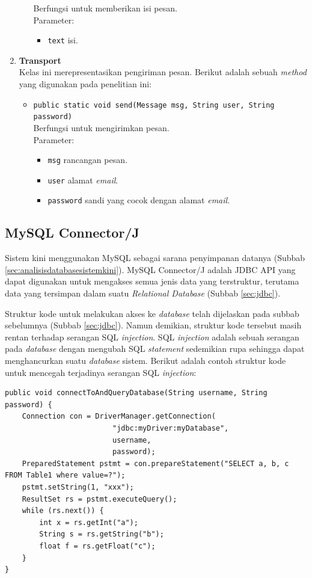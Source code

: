 \begin{enumerate}
\begin{itemize}
			Berfungsi untuk memberikan isi pesan.\\
			Parameter:
				\begin{itemize}
					\item \texttt{text} isi.
				\end{itemize}
		\end{itemize}
	\item \textbf{Transport}\\
	Kelas ini merepresentasikan pengiriman pesan. Berikut adalah sebuah \textit{method} yang digunakan pada penelitian ini:
		\begin{itemize}
			\item \texttt{public static void send(Message msg, String user, String password)}\\
			Berfungsi untuk mengirimkan pesan.\\
			Parameter:
				\begin{itemize}
					\item \texttt{msg} rancangan pesan.
					\item \texttt{user} alamat \textit{email}.
					\item \texttt{password} sandi yang cocok dengan alamat \textit{email}.
				\end{itemize}
		\end{itemize}
\end{enumerate}

\subsection{MySQL Connector/J}
\label{sec:mysqlconnector/j}
Sistem kini menggunakan MySQL sebagai sarana penyimpanan datanya (Subbab \ref{sec:analisisdatabasesistemkini}). MySQL Connector/J adalah JDBC API yang dapat digunakan untuk mengakses semua jenis data yang terstruktur, terutama data yang tersimpan dalam suatu \textit{Relational Database} (Subbab \ref{sec:jdbc}). 

Struktur kode untuk melakukan akses ke \textit{database} telah dijelaskan pada subbab sebelumnya (Subbab \ref{sec:jdbc}). Namun demikian, struktur kode tersebut masih rentan terhadap serangan SQL \textit{injection}. SQL \textit{injection} adalah sebuah serangan pada \textit{database} dengan mengubah SQL \textit{statement} sedemikian rupa sehingga dapat menghancurkan suatu \textit{database} sistem\cite{w3schools}. Berikut adalah contoh struktur kode untuk mencegah terjadinya serangan SQL \textit{injection}:

\begin{lstlisting}
public void connectToAndQueryDatabase(String username, String password) {
    Connection con = DriverManager.getConnection(
                         "jdbc:myDriver:myDatabase",
                         username,
                         password);
    PreparedStatement pstmt = con.prepareStatement("SELECT a, b, c FROM Table1 where value=?");
    pstmt.setString(1, "xxx");
    ResultSet rs = pstmt.executeQuery();
    while (rs.next()) {
        int x = rs.getInt("a");
        String s = rs.getString("b");
        float f = rs.getFloat("c");
    }
}
\end{lstlisting}

